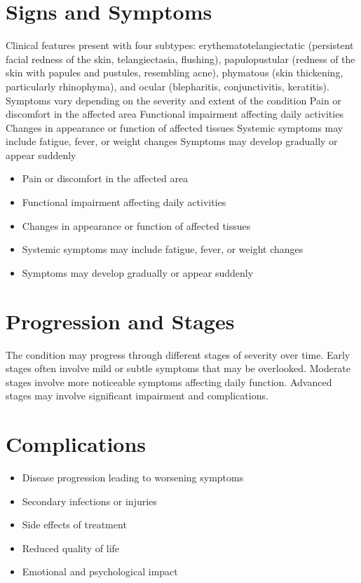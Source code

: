 \section{Signs and Symptoms}
Clinical features present with four subtypes: erythematotelangiectatic (persistent facial redness of the skin, telangiectasia, flushing), papulopustular (redness of the skin with papules and pustules, resembling acne), phymatous (skin thickening, particularly rhinophyma), and ocular (blepharitis, conjunctivitis, keratitis). Symptoms vary depending on the severity and extent of the condition Pain or discomfort in the affected area Functional impairment affecting daily activities Changes in appearance or function of affected tissues Systemic symptoms may include fatigue, fever, or weight changes Symptoms may develop gradually or appear suddenly

\begin{itemize}[noitemsep]
  \item Pain or discomfort in the affected area
  \item Functional impairment affecting daily activities
  \item Changes in appearance or function of affected tissues
  \item Systemic symptoms may include fatigue, fever, or weight changes
  \item Symptoms may develop gradually or appear suddenly
\end{itemize}
\section{Progression and Stages}
The condition may progress through different stages of severity over time. Early stages often involve mild or subtle symptoms that may be overlooked. Moderate stages involve more noticeable symptoms affecting daily function. Advanced stages may involve significant impairment and complications.
\section{Complications}
\begin{itemize}[noitemsep]
  \item Disease progression leading to worsening symptoms
  \item Secondary infections or injuries
  \item Side effects of treatment
  \item Reduced quality of life
  \item Emotional and psychological impact
\end{itemize}
